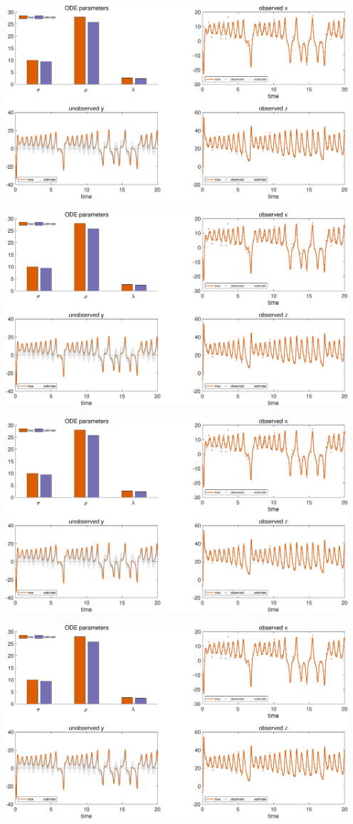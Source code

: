 {\includegraphics [width=5in]{VGM_for_Lorenz_Attractor_22.eps}

\includegraphics [width=5in]{VGM_for_Lorenz_Attractor_23.eps}

\includegraphics [width=5in]{VGM_for_Lorenz_Attractor_24.eps}

\includegraphics [width=5in]{VGM_for_Lorenz_Attractor_25.eps}

}
